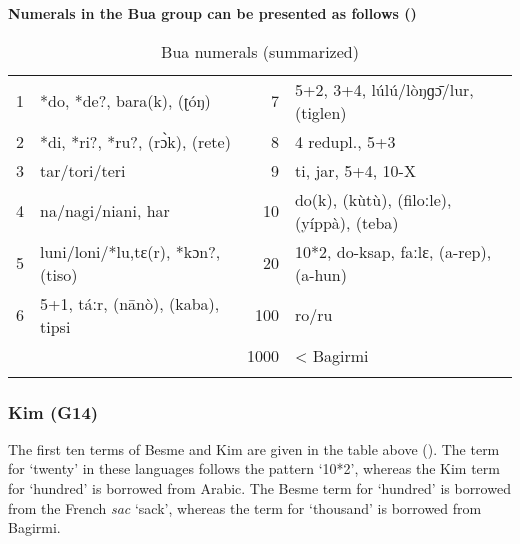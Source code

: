 {\bfseries
\textmd{Numerals in the Bua}\textmd{ group can be presented as follows ()}}

\begin{table}
\caption{\label{tab:3:110}Bua numerals (summarized)}


\begin{tabularx}{\textwidth}{llrQ}
\lsptoprule

1 & *do, *de?, bara(k), (ʈóŋ) & 7 & 5+2, 3+4, lúlú/lòŋɡ{\={ɔ}}/lur, (tiglen)\\
2 & *di, *ri?, *ru?, (r{\`{ɔ}}k), (rete) & 8 & 4 redupl., 5+3\\
3 & tar/tori/teri & 9 & ti, jar, 5+4, 10-X\\
4 & na/nagi/niani, har & 10 & do(k), (kùtù), (filoːle), (yíppà), (teba)\\
5 & luni/loni/*lu,tɛ(r), *kɔn?, (tiso) & 20 & 10*2, do-ksap, faːlɛ,  (a-rep), (a-hun)\\
6 & 5+1, táːr, (nānò), (kaba), tipsi & 100 & ro/ru\\
&  & 1000 & < Bagirmi\\
\lspbottomrule
\end{tabularx}
\end{table}

\clearpage 
\subsubsection{Kim (G14)}%
The first ten terms of Besme and Kim are given in the table above (). The term for ‘twenty’ in these languages follows the pattern ‘10*2’, whereas the Kim term for ‘hundred’ is borrowed from Arabic. The Besme term for ‘hundred’ is borrowed from the French \textit{sac} ‘sack’, whereas the term for ‘thousand’ is borrowed from Bagirmi.


 
